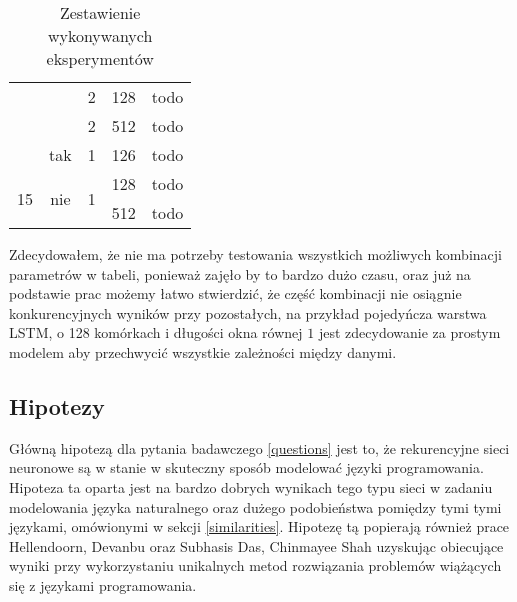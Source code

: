 \begin{table}[ht]
{\begin{tabular}{ccccc}
            \multicolumn{1}{|c|}{}                    & \multicolumn{1}{c|}{}                     & \multicolumn{1}{c|}{2}                  & \multicolumn{1}{c|}{128}                        & \multicolumn{1}{c|}{todo}                         \\ \cline{3-5} 
            \multicolumn{1}{|c|}{}                    & \multicolumn{1}{c|}{}                     & \multicolumn{1}{c|}{2}                  & \multicolumn{1}{c|}{512}                        & \multicolumn{1}{c|}{todo}                         \\ \cline{2-5} 
            \multicolumn{1}{|c|}{}                    & \multicolumn{1}{c|}{tak}                  & \multicolumn{1}{c|}{1}                  & \multicolumn{1}{c|}{126}                        & \multicolumn{1}{c|}{todo}                         \\ \hline
            \multicolumn{1}{|c|}{\multirow{2}{*}{15}} & \multicolumn{1}{c|}{\multirow{2}{*}{nie}} & \multicolumn{1}{c|}{\multirow{2}{*}{1}} & \multicolumn{1}{c|}{128}                        & \multicolumn{1}{c|}{todo}                         \\ \cline{4-5} 
            \multicolumn{1}{|c|}{}                    & \multicolumn{1}{c|}{}                     & \multicolumn{1}{c|}{}                   & \multicolumn{1}{c|}{512}                        & \multicolumn{1}{c|}{todo}                         \\ \hline
            \end{tabular}}
    \caption{Zestawienie wykonywanych eksperymentów} 
    \label{eksperymenty}
\end{table} 
Zdecydowałem, że nie ma potrzeby testowania wszystkich możliwych kombinacji parametrów w tabeli, ponieważ zajęło by to bardzo dużo czasu, oraz już na podstawie prac 
\cite{hellendoorn, pythia} możemy łatwo stwierdzić, że część kombinacji nie osiągnie konkurencyjnych wyników przy pozostałych, na przykład pojedyńcza warstwa LSTM, o 
128 komórkach i długości okna równej \begin{math}1\end{math} jest zdecydowanie za prostym modelem aby przechwycić wszystkie zależności między danymi. 


\subsection{Hipotezy}
Główną hipotezą dla pytania badawczego \ref{questions} jest to, że rekurencyjne sieci neuronowe są w stanie w skuteczny sposób modelować języki programowania. Hipoteza 
ta oparta jest na bardzo dobrych wynikach tego typu sieci w zadaniu modelowania języka naturalnego oraz dużego podobieństwa pomiędzy tymi tymi językami, omówionymi 
w sekcji \ref{similarities}. Hipotezę tą popierają również prace Hellendoorn, Devanbu \cite{hellendoorn} oraz Subhasis Das, Chinmayee Shah \cite{contextual_code_completion} uzyskując
obiecujące wyniki przy wykorzystaniu unikalnych metod rozwiązania problemów wiążących się z językami programowania. 

